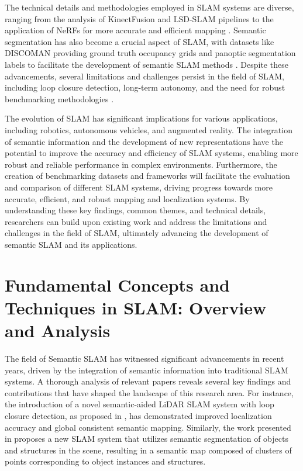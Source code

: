 \documentclass[conference]{IEEEtran}
\begin{document}
The technical details and methodologies employed in SLAM systems are diverse, ranging from the analysis of KinectFusion and LSD-SLAM pipelines to the application of NeRFs for more accurate and efficient mapping \cite{b2}. Semantic segmentation has also become a crucial aspect of SLAM, with datasets like DISCOMAN providing ground truth occupancy grids and panoptic segmentation labels to facilitate the development of semantic SLAM methods \cite{b3}. Despite these advancements, several limitations and challenges persist in the field of SLAM, including loop closure detection, long-term autonomy, and the need for robust benchmarking methodologies \cite{b1} \cite{b5} \cite{b4}.

The evolution of SLAM has significant implications for various applications, including robotics, autonomous vehicles, and augmented reality. The integration of semantic information and the development of new representations have the potential to improve the accuracy and efficiency of SLAM systems, enabling more robust and reliable performance in complex environments. Furthermore, the creation of benchmarking datasets and frameworks will facilitate the evaluation and comparison of different SLAM systems, driving progress towards more accurate, efficient, and robust mapping and localization systems. By understanding these key findings, common themes, and technical details, researchers can build upon existing work and address the limitations and challenges in the field of SLAM, ultimately advancing the development of semantic SLAM and its applications.

\section{Fundamental Concepts and Techniques in SLAM: Overview and Analysis}
The field of Semantic SLAM has witnessed significant advancements in recent years, driven by the integration of semantic information into traditional SLAM systems. A thorough analysis of relevant papers reveals several key findings and contributions that have shaped the landscape of this research area. For instance, the introduction of a novel semantic-aided LiDAR SLAM system with loop closure detection, as proposed in \cite{b1}, has demonstrated improved localization accuracy and global consistent semantic mapping. Similarly, the work presented in \cite{b2} proposes a new SLAM system that utilizes semantic segmentation of objects and structures in the scene, resulting in a semantic map composed of clusters of points corresponding to object instances and structures.
\end{document}
